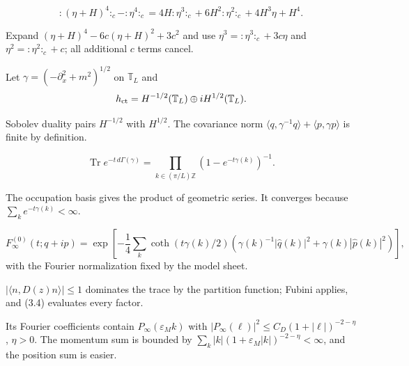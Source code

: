 \documentclass[11pt,a4paper]{article}
\newcommand{\eps}{\varepsilon}
\newcommand{\T}{\mathbb T}
\DeclareMathOperator{\Tr}{Tr}
\begin{document}
\[
 {:}(\eta+H)^4{:}_c-{:}\eta^4{:}_c
 =4H{:}\eta^3{:}_c+6H^2{:}\eta^2{:}_c+4H^3\eta+H^4.
\tag{6.4}
\]

\Because Expand $(\eta+H)^4-6c(\eta+H)^2+3c^2$ and use
$\eta^3={:}\eta^3{:}_c+3c\eta$ and $\eta^2={:}\eta^2{:}_c+c$; all additional
$c$ terms cancel.

\QedStep


Let $\gamma=(-\partial_x^2+m^2)^{1/2}$ on $\T_L$ and
\[
 h_{\rm ct}=H^{-1/2}(\T_L)\oplus iH^{1/2}(\T_L).
\]


\Because Sobolev duality pairs $H^{-1/2}$ with $H^{1/2}$.  The covariance norm
$\langle q,\gamma^{-1}q\rangle+\langle p,\gamma p\rangle$ is finite by definition.

\[
 \Tr e^{-t\,d\Gamma(\gamma)}=\prod_{k\in(\pi/L)\mathbb Z}(1-e^{-t\gamma(k)})^{-1}.
\]

\Because The occupation basis gives the product of geometric series.  It converges
because $\sum_ke^{-t\gamma(k)}<\infty$.

\[
 F_\infty^{(0)}(t;q+ip)
 =\exp\left[-\frac14\sum_k\coth(t\gamma(k)/2)
 \left(\gamma(k)^{-1}|\widehat q(k)|^2+\gamma(k)|\widehat p(k)|^2\right)\right],
\tag{7.1}
\]
with the Fourier normalization fixed by the model sheet.

\Because $|\langle n,D(z)n\rangle|\le1$ dominates the trace by the partition
function; Fubini applies, and (3.4) evaluates every factor.


\Because Its Fourier coefficients contain
$P_\infty(\eps_Mk)$ with
$|P_\infty(\ell)|^2\le C_D(1+|\ell|)^{-2-\eta}$, $\eta>0$.  The momentum
sum is bounded by $\sum_k|k|(1+\eps_M|k|)^{-2-\eta}<\infty$, and the position
sum is easier.

\QedStep

\end{document}
